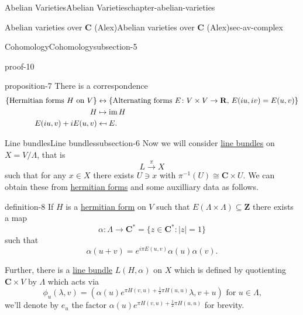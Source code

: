 \documentclass[oneside,10pt,]{book}
\numberwithin{equation}{section}
\providecommand\mapsfrom{\mathrel{\reflectbox{\ensuremath{\mapsto}}}}
\newcommand{\ZZ}{\mathbf{Z}}
\newcommand{\RR}{\mathbf{R}}
\newcommand{\CC}{\mathbf{C}}
\DeclareMathOperator{\im}{im}
\newcommand{\amp}{&}
\begin{document}
\begin{chapterptx}{Abelian Varieties}{}{Abelian Varieties}{}{}{chapter-abelian-varieties}
\begin{sectionptx}{Abelian varieties over \(\CC\) (Alex)}{}{Abelian varieties over \(\CC\) (Alex)}{}{}{sec-av-complex}
\begin{subsectionptx}{Cohomology}{}{Cohomology}{}{}{subsection-5}
\begin{proofptx}{}{proof-10}
\end{proofptx}
\begin{proposition}{}{}{proposition-7}%
\hypertarget{p-56}{}%
There is a correspondence%
\begin{align*}
\{\text{Hermitian forms }H \text{ on } V\} \amp\leftrightarrow\{\text{Alternating forms }E\colon V\times V\to\RR,\,E(iu,iv) = E(u,v)\}\\
H\amp\mapsto \im H\\
E(iu,v)+ i E(u,v) \amp\mapsfrom E\text{.}
\end{align*}
%
\end{proposition}
\end{subsectionptx}
%
%
\typeout{************************************************}
\typeout{************************************************}
%
\begin{subsectionptx}{Line bundles}{}{Line bundles}{}{}{subsection-6}
\hypertarget{p-57}{}%
Now we will consider \hyperref[def-line-bundle]{line bundles} on \(X = V/\Lambda\), that is%
\begin{equation*}
L\xrightarrow{\pi} X
\end{equation*}
such that for any \(x\in X\) there exists \(U\ni x\) with \(\pi^{-1} (U) \cong \CC \times U\). We can obtain these from \hyperref[def-herm-form]{hermitian forms} and some auxilliary data as follows.%
\begin{definition}{}{definition-8}%
\hypertarget{p-58}{}%
If \(H\) is a \hyperref[def-herm-form]{hermitian form} on \(V\) such that \(E(\Lambda\times\Lambda) \subseteq \ZZ\) there exists a map%
\begin{equation*}
\alpha \colon \Lambda \to \CC^*  = \{z\in \CC^* : |z| = 1\}
\end{equation*}
such that%
\begin{equation*}
\alpha(u + v) = e^{i\pi E(u,v)} \alpha(u) \alpha(v)\text{.}
\end{equation*}
%
\par
\hypertarget{p-59}{}%
Further, there is a \hyperref[def-line-bundle]{line bundle} \(L(H, \alpha)\) on \(X\) which is defined by quotienting \(\CC\times V\) by \(\Lambda\) which acts via%
\begin{equation*}
\phi_u(\lambda, v) = (\alpha(u)e^{\pi H(v,u) + \frac12 \pi H(u,u)}\lambda, v+u)\text{ for } u\in \Lambda\text{,}
\end{equation*}
we'll denote by \(e_u\) the factor \(\alpha(u)e^{\pi H(v,u) + \frac12 \pi H(u,u)}\) for brevity.%
\end{definition}

\end{subsectionptx}
\end{sectionptx}
\end{chapterptx}
\end{document}
